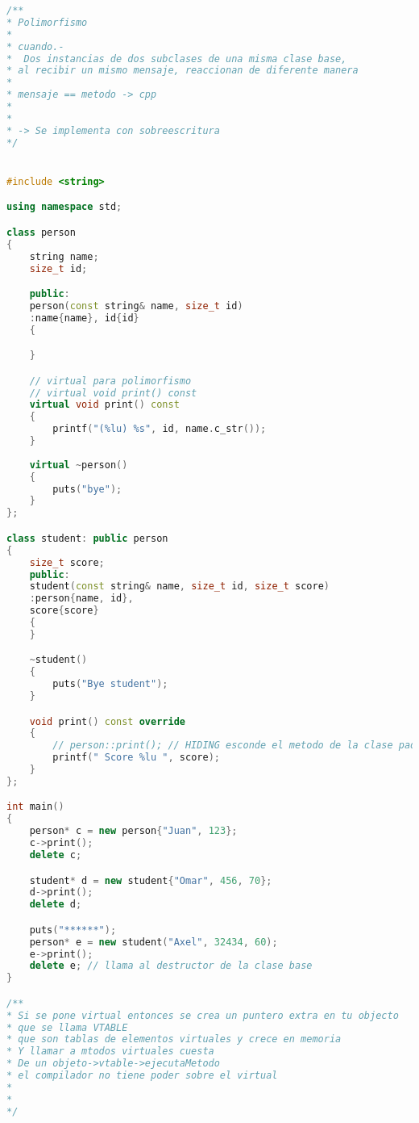 \begin{lstlisting}[language=C++, caption={Polimorfismo 1}]
/**
* Polimorfismo
* 
* cuando.-
*  Dos instancias de dos subclases de una misma clase base,
* al recibir un mismo mensaje, reaccionan de diferente manera
* 
* mensaje == metodo -> cpp
* 
* 
* -> Se implementa con sobreescritura
*/


#include <string>

using namespace std;

class person
{
    string name;
    size_t id;

    public:
    person(const string& name, size_t id)
    :name{name}, id{id}
    {

    }

    // virtual para polimorfismo
    // virtual void print() const
    virtual void print() const
    {
        printf("(%lu) %s", id, name.c_str());
    }
    
    virtual ~person()
    {
        puts("bye");
    }
};

class student: public person
{
    size_t score;
    public:
    student(const string& name, size_t id, size_t score)
    :person{name, id},
    score{score}
    {
    }

    ~student()
    {
        puts("Bye student");
    }

    void print() const override
    {
        // person::print(); // HIDING esconde el metodo de la clase padre
        printf(" Score %lu ", score);
    }
};

int main()
{
    person* c = new person{"Juan", 123};
    c->print();
    delete c;

    student* d = new student{"Omar", 456, 70};
    d->print();
    delete d;

    puts("******");
    person* e = new student("Axel", 32434, 60);
    e->print();
    delete e; // llama al destructor de la clase base
}

/**
* Si se pone virtual entonces se crea un puntero extra en tu objecto
* que se llama VTABLE
* que son tablas de elementos virtuales y crece en memoria
* Y llamar a mtodos virtuales cuesta
* De un objeto->vtable->ejecutaMetodo
* el compilador no tiene poder sobre el virtual
* 
* 
*/
\end{lstlisting}

